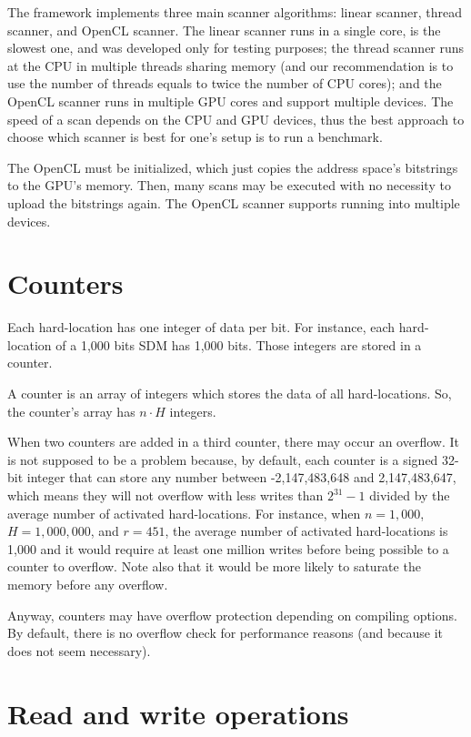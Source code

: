The framework implements three main scanner algorithms: linear scanner, thread scanner, and OpenCL scanner. The linear scanner runs in a single core, is the slowest one, and was developed only for testing purposes; the thread scanner runs at the CPU in multiple threads sharing memory (and our recommendation is to use the number of threads equals to twice the number of CPU cores); and the OpenCL scanner runs in multiple GPU cores and support multiple devices. The speed of a scan depends on the CPU and GPU devices, thus the best approach to choose which scanner is best for one's setup is to run a benchmark.

The OpenCL must be initialized, which just copies the address space's bitstrings to the GPU's memory. Then, many scans may be executed with no necessity to upload the bitstrings again. The OpenCL scanner supports running into multiple devices.


\section{Counters}

Each hard-location has one integer of data per bit. For instance, each hard-location of a 1,000 bits SDM has 1,000 bits. Those integers are stored in a counter.

A counter is an array of integers which stores the data of all hard-locations. So, the counter's array has $n \cdot H$ integers.

When two counters are added in a third counter, there may occur an overflow. It is not supposed to be a problem because, by default, each counter is a signed 32-bit integer that can store any number between -2,147,483,648 and 2,147,483,647, which means they will not overflow with less writes than $2^{31}-1$ divided by the average number of activated hard-locations. For instance, when $n=1,000$, $H=1,000,000$, and $r=451$, the average number of activated hard-locations is 1,000 and it would require at least one million writes before being possible to a counter to overflow.  Note also that it would be more likely to saturate the memory before any overflow.

Anyway, counters may have overflow protection depending on compiling options. By default, there is no overflow check for performance reasons (and because it does not seem necessary).

\section{Read and write operations}

